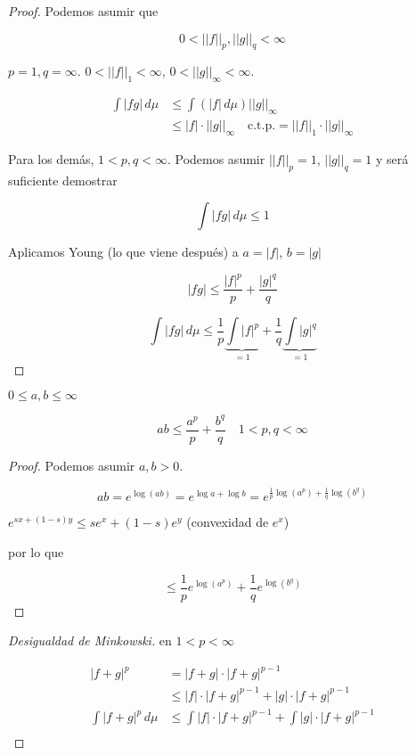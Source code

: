 \begin{proof}
    Podemos asumir que

    \[0<||f||_p,||g||_q<\infty\]

    $p=1,q=\infty$. $0<||f||_1<\infty$, $0<||g||_\infty<\infty$.

    \begin{align*}
        \int |fg|\,d\mu&\leq \int(|f|\,d\mu)||g||_\infty\\
        &\leq |f|\cdot ||g||_\infty \quad \text{c.t.p.}=||f||_1\cdot ||g||_\infty
    \end{align*}

    Para los demás, $1<p,q<\infty$. Podemos asumir $||f||_p=1$, $||g||_q=1$ y será suficiente demostrar 

    \[\int |fg|\,d\mu\leq 1\]

    Aplicamos Young (lo que viene después) a $a=|f|$, $b=|g|$

    \[|fg|\leq \frac{|f|^p}{p}+\frac{|g|^q}{q}\]

    \[\int |fg|\,d\mu\leq \frac{1}{p}\underbrace{\int |f|^p}_{=1}+\frac{1}{q}\underbrace{\int |g|^q}_{=1}\]
\end{proof}

\begin{ftheorem}
    $0\leq a,b\leq \infty$

    \[ab\leq \frac{a^p}{p}+\frac{b^q}{q}\quad 1<p,q<\infty\]
\end{ftheorem}

\begin{proof}
    Podemos asumir $a,b>0$.

    \[ab=e^{\log (ab)}=e^{\log a+\log b}=e^{\frac{1}{p}\log (a^p)+\frac{1}{q}\log (b^q)}\]

    $e^{sx+(1-s)y}\leq se^{x}+(1-s)e^y$ (convexidad de $e^x$)

    por lo que 

    \[\leq \frac{1}{p}e^{\log (a^p)}+\frac{1}{q}e^{\log(b^q)}\]
\end{proof}

\begin{proof}[Desigualdad de Minkowski]
    en $1<p<\infty$ 

    \begin{align*}
        |f+g|^p&=|f+g|\cdot |f+g|^{p-1}\\
        &\leq |f|\cdot |f+g|^{p-1}+|g|\cdot |f+g|^{p-1}\\
        \int|f+g|^p\,d\mu&\leq \int |f|\cdot |f+g|^{p-1}+\int |g|\cdot |f+g|^{p-1}\\
    \end{align*}
\end{proof}